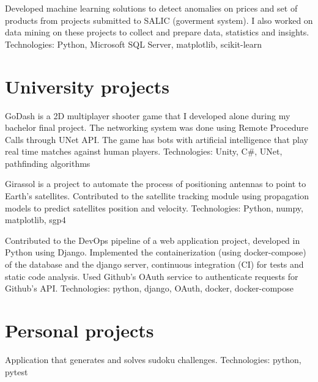 \documentclass[10pt,a4paper,sans]{moderncv}
\begin{document}
    {Developed machine learning solutions to detect anomalies on prices and set of products from projects submitted to SALIC (goverment system).
I also worked on data mining on these projects to collect and prepare data, statistics and insights. Technologies:
    Python, Microsoft SQL Server, matplotlib, scikit-learn}


\section{University projects}

    {GoDash is a 2D multiplayer shooter game that I developed alone during my bachelor final project. The networking system was done using Remote Procedure Calls through UNet API. The game has bots with artificial intelligence that play real time matches against human players.
    Technologies: Unity, C\#, UNet, pathfinding algorithms}
    
    {Girassol is a project to automate the process of positioning antennas to point to Earth's satellites. Contributed to the satellite tracking module using propagation models to
    predict satellites position and velocity. 
    Technologies: Python, numpy, matplotlib, sgp4}

    {Contributed to the DevOps pipeline of a web application
    project, developed in Python using Django. Implemented the containerization
    (using docker-compose) of the database and the django server, continuous integration (CI) for tests and
    static code analysis. Used Github's OAuth service to authenticate requests for Github's API.
    Technologies: python, django, OAuth, docker, docker-compose}


\section{Personal projects}
    {Application that generates and solves sudoku challenges. Technologies: python, pytest}
\end{document}
